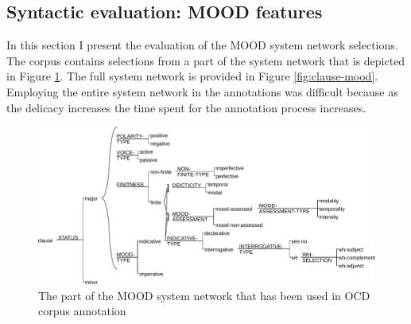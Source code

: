 \subsection{Syntactic evaluation: MOOD features}
\label{sec:syntactic-features}
    In this section I present the evaluation of the MOOD system network selections. The corpus contains selections from a part of the system network that is depicted in Figure \ref{fig:mood-ocd-simplified}. The full system network is provided in Figure \ref{fig:clause-mood}. Employing the entire system network in the annotations was difficult because as the delicacy increases the time spent for the annotation process increases. 

    \begin{figure}[!ht]
        \centering
        \includegraphics[width=.65\textwidth]{Figures/Evaluation/ocd1-mood-simplified.pdf}
        \caption{The part of the MOOD system network that has been used in OCD corpus annotation}
        \label{fig:mood-ocd-simplified}
    \end{figure}

